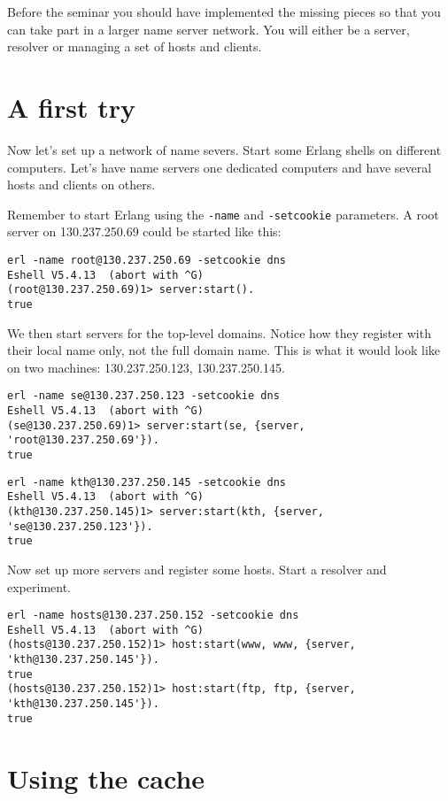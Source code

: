 \documentclass[a4paper, 11pt]{article}
\begin{document}
Before the seminar you should have implemented the missing pieces so
that you can take part in a larger name server network. You will
either be a server, resolver or managing a set of hosts and clients.


\section{A first try}

Now let's set up a network of name severs. Start some Erlang shells on
different computers. Let's have name servers one dedicated computers
and have several hosts and clients on others.

Remember to start Erlang using the {\tt -name} and {\tt -setcookie}
parameters. A root server on 130.237.250.69 could be started like
this:

\begin{verbatim}
erl -name root@130.237.250.69 -setcookie dns
Eshell V5.4.13  (abort with ^G)
(root@130.237.250.69)1> server:start().
true
\end{verbatim}

We then start servers for the top-level domains. Notice how they
register with their local name only, not the full domain name. This is
what it would look like on two machines: 130.237.250.123, 130.237.250.145.

\begin{verbatim}
erl -name se@130.237.250.123 -setcookie dns
Eshell V5.4.13  (abort with ^G)
(se@130.237.250.69)1> server:start(se, {server, 'root@130.237.250.69'}).
true
\end{verbatim}


\begin{verbatim}
erl -name kth@130.237.250.145 -setcookie dns
Eshell V5.4.13  (abort with ^G)
(kth@130.237.250.145)1> server:start(kth, {server, 'se@130.237.250.123'}).
true
\end{verbatim}

Now set up more servers and register some hosts. Start a resolver and
experiment.

\begin{verbatim}
erl -name hosts@130.237.250.152 -setcookie dns
Eshell V5.4.13  (abort with ^G)
(hosts@130.237.250.152)1> host:start(www, www, {server, 'kth@130.237.250.145'}).
true
(hosts@130.237.250.152)1> host:start(ftp, ftp, {server, 'kth@130.237.250.145'}).
true
\end{verbatim}


\section{Using the cache}
\end{document}
